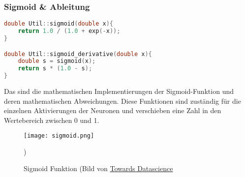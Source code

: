 \subsubsection{Sigmoid \& Ableitung}
\label{sec:RealSigmoidAbleitungCode}
\begin{lstlisting}[language=C++]
double Util::sigmoid(double x){
	return 1.0 / (1.0 + exp(-x));
}

double Util::sigmoid_derivative(double x){
	double s = sigmoid(x);
	return s * (1.0 - s);
}
\end{lstlisting}
Das sind die mathematischen Implementierungen der Sigmoid-Funktion und deren mathematischen Abweichungen. Diese Funktionen sind zuständig für die einzelnen Aktivierungen der Neuronen und verschieben eine Zahl in den Wertebereich zwischen 0 und 1.
\begin{figure}[H]
	\centering
		\texttt{[image: sigmoid.png]}
		\caption{Sigmoid Funktion (Bild von \href{https://towardsdatascience.com/derivative-of-the-sigmoid-function-536880cf918e}{Towards Datascience}})
	\label{fig:sigmoid}
\end{figure}

